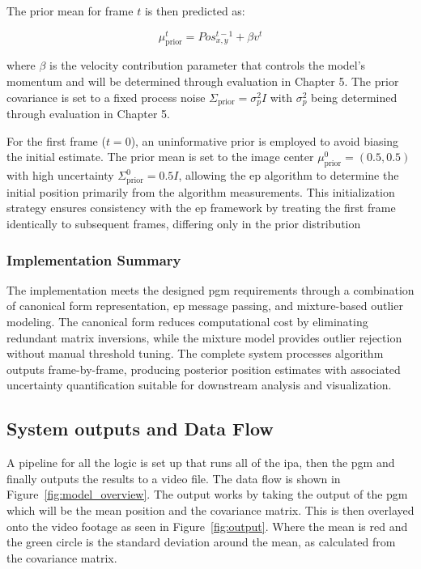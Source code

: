 \documentclass[12pt,a4paper]{article}
\begin{document}
The prior mean for frame $t$ is then predicted as:

\begin{equation}
\mu_{\text{prior}}^t = Pos_{x,y}^{t-1} + \beta v^t
\end{equation}

where $\beta$ is the velocity contribution parameter that controls the model's momentum and will be determined through evaluation in Chapter 5. The prior covariance is set to a fixed process noise $\Sigma_{\text{prior}} = \sigma_p^2 I$ with $\sigma_p^2$ being determined through evaluation in Chapter 5.

For the first frame ($t=0$), an uninformative prior is employed to avoid biasing the initial estimate. The prior mean is set to the image center $\mu_{\text{prior}}^0 = (0.5, 0.5)$ with high uncertainty $\Sigma_{\text{prior}}^0 = 0.5 I$, allowing the \acs{ep} algorithm to determine the initial position primarily from the algorithm measurements. This initialization strategy ensures consistency with the \acs{ep} framework by treating the first frame identically to subsequent frames, differing only in the prior distribution

\subsubsection{Implementation Summary}
The implementation meets the designed \acs{pgm} requirements through a combination of canonical form representation, \acs{ep} message passing, and mixture-based outlier modeling. The canonical form reduces computational cost by eliminating redundant matrix inversions, while the mixture model provides outlier rejection without manual threshold tuning. The complete system processes algorithm outputs frame-by-frame, producing posterior position estimates with associated uncertainty quantification suitable for downstream analysis and visualization.


\subsection{System outputs and Data Flow}
A pipeline for all the logic is set up that runs all of the \acs{ipa}, then the \acs{pgm} and finally outputs the results to a video file. The data flow is shown in Figure~\ref{fig:model_overview}. The output works by taking the output of the \acs{pgm} which will be the mean position and the covariance matrix. This is then overlayed onto the video footage as seen in Figure~\ref{fig:output}. Where the mean is red and the green circle is the standard deviation around the mean, as calculated from the covariance matrix.
\end{document}
